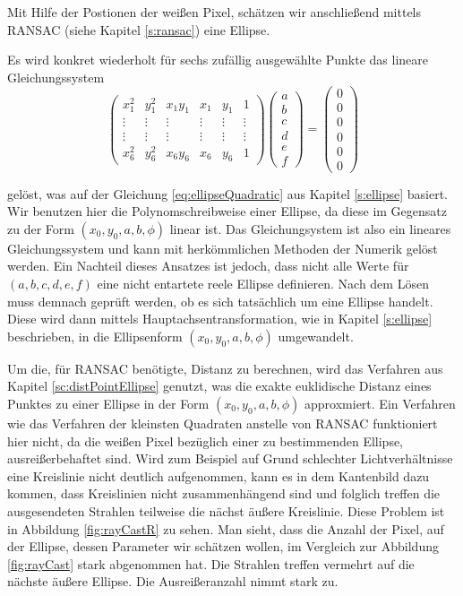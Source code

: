 Mit Hilfe der Postionen der weißen Pixel, schätzen wir anschließend mittels RANSAC (siehe Kapitel \ref{s:ransac}) eine Ellipse.

Es wird konkret wiederholt für sechs zufällig ausgewählte Punkte das lineare Gleichungssystem
\[
\begin{pmatrix}
x_1^2 & y_1^2 & x_1y_1 & x_1 & y_1 & 1\\
\vdots &\vdots & \vdots & \vdots &\vdots & \vdots\\
\vdots &\vdots & \vdots & \vdots &\vdots & \vdots\\
x_6^2 & y_6^2 & x_6y_6 & x_6 & y_6 & 1
\end{pmatrix} \begin{pmatrix}
a \\ b \\ c \\ d \\ e \\ f
\end{pmatrix} = \begin{pmatrix}
0 \\ 0 \\ 0 \\ 0 \\ 0 \\ 0
\end{pmatrix}
\]

gelöst, was auf der Gleichung \ref{eq:ellipseQuadratic} aus Kapitel \ref{s:ellipse} basiert. Wir benutzen hier die Polynomschreibweise einer Ellipse, da diese im Gegensatz zu der Form $(x_0,y_0,a,b,\phi)$ linear ist. Das Gleichungsystem ist also ein lineares Gleichungssystem und kann mit herkömmlichen Methoden der Numerik gelöst werden. Ein Nachteil dieses Ansatzes ist jedoch, dass nicht alle Werte für $(a,b,c,d,e,f)$ eine nicht entartete reele Ellipse definieren. Nach dem Lösen muss demnach geprüft werden, ob es sich tatsächlich um eine Ellipse handelt.
Diese wird dann mittels Hauptachsentransformation, wie in Kapitel \ref{s:ellipse} beschrieben, in die Ellipsenform $(x_0,y_0,a,b,\phi)$ umgewandelt.

Um die, für RANSAC benötigte, Distanz zu berechnen, wird das Verfahren aus Kapitel \ref{sc:distPointEllipse} genutzt, was die exakte euklidische Distanz eines Punktes zu einer Ellipse in der Form $(x_0,y_0,a,b,\phi)$ approxmiert.
Ein Verfahren wie das Verfahren der kleinsten Quadraten anstelle von RANSAC funktioniert hier nicht, da die weißen Pixel bezüglich einer zu bestimmenden Ellipse, ausreißerbehaftet sind. Wird zum Beispiel auf Grund schlechter Lichtverhältnisse eine Kreislinie nicht deutlich aufgenommen, kann es in dem Kantenbild dazu kommen, dass Kreislinien nicht zusammenhängend sind und folglich treffen die ausgesendeten Strahlen teilweise die nächst äußere Kreislinie. Diese Problem ist in Abbildung \ref{fig:rayCastR} zu sehen. Man sieht, dass die Anzahl der Pixel, auf der Ellipse, dessen Parameter wir schätzen wollen, im Vergleich zur Abbildung \ref{fig:rayCast} stark abgenommen hat. Die Strahlen treffen vermehrt auf die nächste äußere Ellipse. Die Ausreißeranzahl nimmt stark zu.

